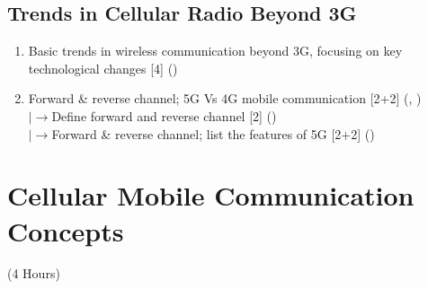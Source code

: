 \documentclass[12pt]{article}
\newcommand{\lb}{\\$\left|\rightarrow\right.$}
\begin{document}
  \subsection{Trends in Cellular Radio Beyond 3G}
    \begin{enumerate}[topsep=0pt, noitemsep]
      \item Basic trends in wireless communication beyond 3G, focusing on key technological changes \hfill [4] ()
      \item Forward \& reverse channel; 5G Vs 4G mobile communication \hfill [2+2] (, )
        \lb Define forward and reverse channel \hfill [2] ()
        \lb Forward \& reverse channel; list the features of 5G \hfill [2+2] ()
    \end{enumerate}

\pagebreak
\section{Cellular Mobile Communication Concepts}
\begin{center}(4 Hours)\end{center}
\end{document}
